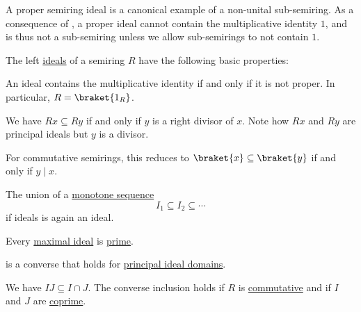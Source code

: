 \begin{remark}\label{rem:semiring_ideal_as_sub_semiring}
  A proper semiring ideal is a canonical example of a non-unital sub-semiring. As a consequence of , a proper ideal cannot contain the multiplicative identity \( 1 \), and is thus not a sub-semiring unless we allow sub-semirings to not contain \( 1 \).
\end{remark}

\begin{proposition}\label{thm:def:semiring_ideal/properties}
  The left \hyperref[def:semiring_ideal]{ideals} of a semiring \( R \) have the following basic properties:
  \begin{thmenum}[series=thm:def:semiring_ideal/properties]
     An ideal contains the multiplicative identity if and only if it is not proper. In particular, \( R = \braket{ 1_R } \).

     We have \( Rx \subseteq Ry \) if and only if \( y \) is a right divisor of \( x \). Note how \( Rx \) and \( Ry \) are  principal ideals but \( y \) is a  divisor.

    For commutative semirings, this reduces to \( \braket{ x } \subseteq \braket{ y } \) if and only if \( y \mid x \).

     The union of a \hyperref[eq:def:partially_ordered_set/homomorphism/sequence]{monotone sequence}
    \begin{equation*}
      I_1 \subseteq I_2 \subseteq \cdots
    \end{equation*}
    if ideals is again an ideal.

     Every \hyperref[def:semiring_ideal/maximal]{maximal ideal} is \hyperref[def:semiring_ideal/prime]{prime}.

     is a converse that holds for \hyperref[def:principal_ideal_domain]{principal ideal domains}.

     We have \( IJ \subseteq I \cap J \). The converse inclusion holds if \( R \) is \hyperref[def:semiring/commutative]{commutative} and if \( I \) and \( J \) are \hyperref[def:semiring_ideal/coprime]{coprime}.
  \end{thmenum}


\end{proposition}
